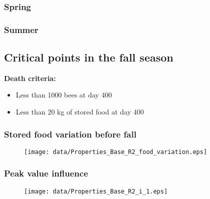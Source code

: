 \documentclass[
	paper=128mm:96mm,
	fontsize=11pt,
	pagesize,
	parskip=half-,
]{scrartcl}
\theoremstyle{mythmstyle} %
\begin{document}
\subsubsection*{Spring}
	\begin{figure}[H]
	\end{figure}
	\clearpage
\subsubsection*{Summer}
	\begin{figure}[H]
	\end{figure}
	\clearpage
\subsection*{Critical points in the fall season}
\textbf{Death criteria:}
	\begin{itemize}
		\item Less than 1000 bees at day 400
		\item Less than 20 kg of stored food at day 400
	\end{itemize}
	\clearpage
\subsubsection*{Stored food variation before fall}
	\begin{figure}[H]
		\centering
		\texttt{[image: data/Properties\_Base\_R2\_food\_variation.eps]}
	\end{figure}
	\clearpage
\subsubsection*{Peak value influence}
	\begin{figure}[H]
		\centering
		\texttt{[image: data/Properties\_Base\_R2\_i\_1.eps]}
	\end{figure}
	\clearpage
\end{document}
